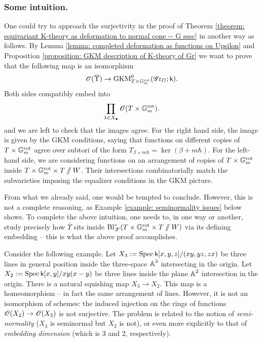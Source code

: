 \subsubsection{Some intuition.}
One could try to approach the surjectivity in the proof of Theorem \ref{theorem: equivariant K-theory as deformation to normal cone -- G sssc} in another way as follows. By Lemma \ref{lemma: completed deformation as functions on Upsilon} and Proposition \ref{proposition: GKM description of K-theory of Gr} we want to prove that the following map is an isomorphism
\begin{equation*}
   \operatorname{\mathscr{O}}(\overline{\Upsilon}) \to \operatorname{GKM}^{0}_{T \times \mathbb{G}_m^{\mathrm{rot}}}(\operatorname{\mathscr{G}r}_G; \mathsf{k}). 
\end{equation*}
Both sides compatibly embed into
\begin{equation}\label{equation: product of copies of torus}
    \prod_{\lambda \in X_{\bullet}} \operatorname{\mathscr{O}}(T \times \mathbb{G}_m^{\mathrm{rot}}).
\end{equation}
and we are left to check that the images agree. For the right hand side, the image is given by the GKM conditions, saying that functions on different copies of $T \times \mathbb{G}_m^{\mathrm{rot}}$ agree over subtori of the form $T_{\beta + m\hbar} = \ker(\beta + m\hbar)$.
For the left-hand side, we are considering functions on an arrangement of copies of $T \times \mathbb{G}_m^{\mathrm{rot}}$ inside $T \times \mathbb{G}_m^{\mathrm{rot}} \times T\sslash W$. Their intersections combinatorially match the subvarieties imposing the equalizer conditions in the GKM picture.

From what we already said, one would be tempted to conclude. However, this is not a complete reasoning, as Example \ref{example: seminormality issues} below shows. To complete the above intuition, one needs to, in one way or another, study precisely how $\overline{\Upsilon}$ sits inside $\operatorname{Bl}^{\circ}_{\operatorname{\mathscr{Z}}}( T \times \mathbb{G}_m^{\mathrm{rot}} \times T \sslash W)$ via its defining embedding -- this is what the above proof accomplishes.

\begin{example}\label{example: seminormality issues}
 Consider the following example. Let $X_3 := \operatorname{Spec} \mathsf{k}[x,y, z] / (xy, yz, zx)$ be three lines in general position inside the three-space $\operatorname{\mathbb{A}}^3$ intersecting in the origin. Let $X_2 := \operatorname{Spec} \mathsf{k}[x, y] / xy(x-y)$ be three lines inside the plane $\operatorname{\mathbb{A}}^2$ intersection in the origin.  There is a natural squishing map $X_3 \to X_2$. This map is a homeomorphism -- in fact the same arrangement of lines. However, it is not an isomorphism of schemes: the induced injection on the rings of functions $\operatorname{\mathscr{O}}(X_2) \to \operatorname{\mathscr{O}}(X_3)$ is not surjective. The problem is related to the notion of \textit{semi-normality} ($X_3$ is seminormal but $X_2$ is not), or even more explicitly to that of \textit{embedding dimension} (which is $3$ and $2$, respectively).   
\end{example}



